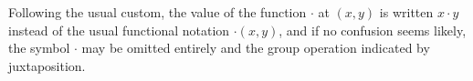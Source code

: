 Following the usual custom, the value of the function $\cdot$ at $(x, y)$ is written $x \cdot y$ instead of the usual functional notation $\cdot(x, y)$, and if no confusion seems likely, the symbol $\cdot$ may be omitted entirely and the group operation indicated by juxtaposition.
